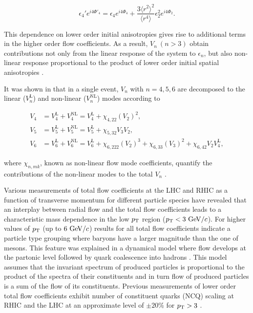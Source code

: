 \begin{equation}
\epsilon_{4}'e^{i4\Phi'_4} = \epsilon_{4}e^{i4\Phi_4}  + \frac{3\langle{r^{2}}\rangle^{2}}{\langle r^4\rangle}\epsilon_{2}^{2}e^{i4\Phi_2}. 
\label{Eq:epsilonnprime}
\end{equation}

This dependence on lower order initial anisotropies gives rise to additional terms in the higher order flow coefficients. As a result, $V_n~(n > 3)$ obtain contributions not only from the linear response of the system to $\epsilon_{n}$, but also non-linear response proportional to the product of lower order initial spatial anisotropies \cite{Bhalerao:2014xra,Yan:2015jma}. 

It was shown in \cite{Acharya:2017zfg} that in a single event, $V_n$ with $n=4,5,6$ are decomposed to the linear ($V_{n}^{\mathrm{L}} $) and non-linear ($ V_{n}^{\mathrm{NL}}$) modes according to

\vspace{-0.55cm}
\begin{align}
V_{4} &= V_{4}^{\mathrm{L}} + V_{4}^{\mathrm{NL}} = V_{4}^{\mathrm{L}} + \chi_{4,22}(V_{2})^2, \nonumber \\
V_{5} &= V_{5}^{\mathrm{L}} + V_{5}^{\mathrm{NL}} = V_{5}^{\mathrm{L}} + \chi_{5,32}V_{3}V_{2}, \nonumber \\
V_{6} &= V_{6}^{\mathrm{L}} + V_{6}^{\mathrm{NL}} = V_{6}^{\mathrm{L}} + \chi_{6,222}(V_{2})^3 + \chi_{6,33}(V_{3})^2 + \chi_{6,42}V_{2}V_{4}^{\mathrm{L}},
\label{Eq:V4V5V6}
\end{align}
\vspace{-0.55cm}

where $\chi_{n,mk}$, known as non-linear flow mode coefficients, quantify the contributions of the non-linear modes to the total $V_{n}$ \cite{Acharya:2017zfg}.  
 
 Various measurements of total flow coefficients at the LHC \cite{Abelev:2014pua,Adam:2015eta,Adam:2016nfo,Acharya:2018zuq} and RHIC \cite{Adams:2003am,Abelev:2007qg,Adler:2003kt,Adare:2006ti} as a function of transverse momentum for different particle species have revealed that an interplay between radial flow and the total flow coefficients leads to a characteristic mass dependence in the low $p_{\rm{T}}$ region ($p_{\rm{T}} < 3~{\rm GeV}/c$). For higher values of $p_{\rm{T}}$ (up to $6~{\rm GeV}/c$) results for all total flow coefficients indicate a particle type grouping where baryons have a larger magnitude than the one of mesons. This feature was explained in a dynamical model where flow develops at the partonic level followed by quark coalescence into hadrons \cite{Voloshin:2002wa,Molnar:2003ff}. This model assumes that the invariant spectrum of produced particles is proportional to the product of the spectra of their constituents and in turn flow of produced particles is a sum of the flow of its constituents. Previous measurements of lower order total flow coefficients exhibit number of constituent quarks (NCQ) scaling at RHIC \cite{Adare:2012vq} and the LHC \cite{Abelev:2014pua,Adam:2016nfo} at an approximate level of $\pm20$\% for $p_{\rm{T}} > 3$ \GeV.

